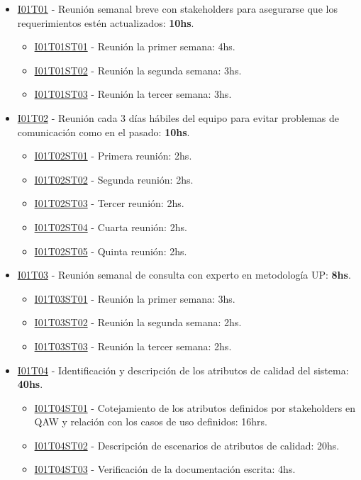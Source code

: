 \begin{itemize}
\item \underline{I01T01} - Reunión semanal breve con stakeholders para asegurarse que los requerimientos estén actualizados: \textbf{10hs}.
  \begin{itemize}
    \item \underline{I01T01ST01} - Reunión la primer semana: 4hs.
    \item \underline{I01T01ST02} - Reunión la segunda semana: 3hs.
    \item \underline{I01T01ST03} - Reunión la tercer semana: 3hs.
  \end{itemize}
\hfill

\item \underline{I01T02} - Reunión cada 3 días hábiles del equipo para evitar problemas de comunicación como en el pasado: \textbf{10hs}.
  \begin{itemize}
    \item \underline{I01T02ST01} - Primera reunión: 2hs.
    \item \underline{I01T02ST02} - Segunda reunión: 2hs.
    \item \underline{I01T02ST03} - Tercer reunión: 2hs.
    \item \underline{I01T02ST04} - Cuarta reunión: 2hs.
    \item \underline{I01T02ST05} - Quinta reunión: 2hs.
  \end{itemize}
\hfill

\item \underline{I01T03} - Reunión semanal de consulta con experto en metodología UP: \textbf{8hs}.
  \begin{itemize}
    \item \underline{I01T03ST01} - Reunión la primer semana: 3hs.
    \item \underline{I01T03ST02} - Reunión la segunda semana: 2hs.
    \item \underline{I01T03ST03} - Reunión la tercer semana: 2hs.
  \end{itemize}
\hfill

\item \underline{I01T04} - Identificación y descripción de los atributos de calidad del sistema: \textbf{40hs}.
  \begin{itemize}
    \item \underline{I01T04ST01} - Cotejamiento de los atributos definidos por stakeholders en QAW y relación con los casos de uso definidos: 16hrs.
    \item \underline{I01T04ST02} - Descripción de escenarios de atributos de calidad: 20hs.
    \item \underline{I01T04ST03} - Verificación de la documentación escrita: 4hs.
  \end{itemize}
\hfill
  

\end{itemize}
